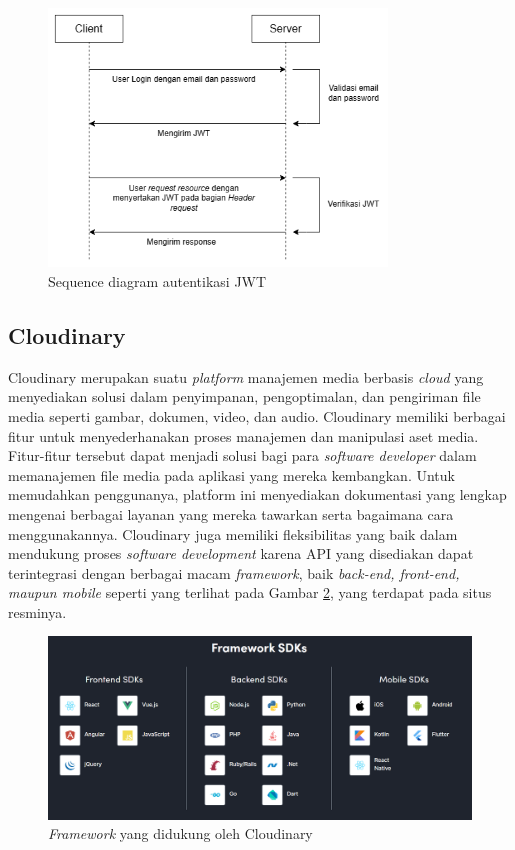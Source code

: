 \begin{figure}[h]
	\centering
	\includegraphics[width=9cm]{contents/chapter-2/jwt_works.png}
	\caption{Sequence diagram autentikasi JWT}
	\label{Fig:JWT_works}
\end{figure}


\subsection{Cloudinary}

Cloudinary merupakan suatu \textit{platform} manajemen media berbasis \textit{cloud} 
yang menyediakan solusi dalam penyimpanan, pengoptimalan, dan pengiriman file media 
seperti gambar, dokumen, video, dan audio\cite{ayuningtyas2017undangan}. Cloudinary 
memiliki berbagai fitur untuk menyederhanakan proses manajemen dan manipulasi 
aset media. Fitur-fitur tersebut dapat menjadi solusi bagi para 
\textit{software developer} dalam memanajemen file media pada aplikasi yang 
mereka kembangkan. Untuk memudahkan penggunanya, platform ini menyediakan 
dokumentasi yang lengkap mengenai berbagai layanan yang mereka tawarkan serta 
bagaimana cara menggunakannya. Cloudinary juga memiliki fleksibilitas yang 
baik dalam mendukung proses \textit{software development} karena API yang 
disediakan dapat terintegrasi dengan berbagai macam \textit{framework}, baik 
\textit{back-end, front-end, \emph{maupun} mobile} seperti yang terlihat pada
Gambar \ref{Fig:cloudinary_framework}, yang terdapat pada situs resminya\cite{cloudinary-website}.

\begin{figure}[h]
	\centering
	\includegraphics[width=12cm]{contents/chapter-2/cloudinary_framework.png}
	\caption{\textit{Framework} yang didukung oleh Cloudinary \cite{cloudinary-website}}
	\label{Fig:cloudinary_framework}
\end{figure}

